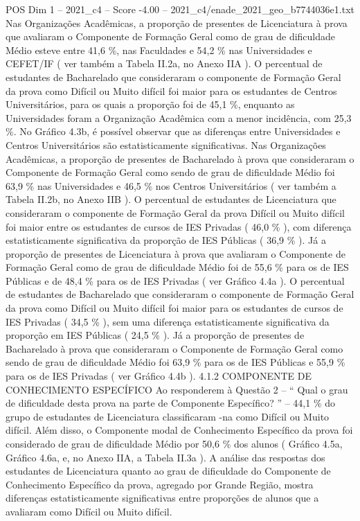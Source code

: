 \begin{textsample}{POS Dim 1 – 2021\_c4 – Score -4.00 – 2021\_c4/enade\_2021\_geo\_b7744036e1.txt}
Nas Organizações Acadêmicas, a proporção de presentes de Licenciatura à prova que avaliaram o Componente de Formação Geral como de grau de dificuldade Médio esteve entre 41,6 \%, nas Faculdades e 54,2 \% nas Universidades e CEFET/IF ( ver também a Tabela II.2a, no Anexo IIA ).
O percentual de estudantes de Bacharelado que consideraram o componente de Formação Geral da prova como Difícil ou Muito difícil foi maior para os estudantes de Centros Universitários, para os quais a proporção foi de 45,1 \%, enquanto as Universidades foram a Organização Acadêmica com a menor incidência, com 25,3 \%.
No Gráfico 4.3b, é possível observar que as diferenças entre Universidades e Centros Universitários são estatisticamente significativas.
Nas Organizações Acadêmicas, a proporção de presentes de Bacharelado à prova que consideraram o Componente de Formação Geral como sendo de grau de dificuldade Médio foi 63,9 \% nas Universidades e 46,5 \% nos Centros Universitários ( ver também a Tabela II.2b, no Anexo IIB ).
O percentual de estudantes de Licenciatura que consideraram o componente de Formação Geral da prova Difícil ou Muito difícil foi maior entre os estudantes de cursos de IES Privadas ( 46,0 \% ), com diferença estatisticamente significativa da proporção de IES Públicas ( 36,9 \% ).
Já a proporção de presentes de Licenciatura à prova que avaliaram o Componente de Formação Geral como de grau de dificuldade Médio foi de 55,6 \% para os de IES Públicas e de 48,4 \% para os de IES Privadas ( ver Gráfico 4.4a ).
O percentual de estudantes de Bacharelado que consideraram o componente de Formação Geral da prova como Difícil ou Muito difícil foi maior para os estudantes de cursos de IES Privadas ( 34,5 \% ), sem uma diferença estatisticamente significativa da proporção em IES Públicas ( 24,5 \% ).
Já a proporção de presentes de Bacharelado à prova que consideraram o Componente de Formação Geral como sendo de grau de dificuldade Médio foi 63,9 \% para os de IES Públicas e 55,9 \% para os de IES Privadas ( ver Gráfico 4.4b ). 4.1.2 COMPONENTE DE CONHECIMENTO ESPECÍFICO Ao responderem à Questão 2 – “ Qual o grau de dificuldade desta prova na parte de Componente Específico? ” – 44,1 \% do grupo de estudantes de Licenciatura classificaram -na como Difícil ou Muito difícil.
Além disso, o Componente modal de Conhecimento Específico da prova foi considerado de grau de dificuldade Médio por 50,6 \% dos alunos ( Gráfico 4.5a, Gráfico 4.6a, e, no Anexo IIA, a Tabela II.3a ).
A análise das respostas dos estudantes de Licenciatura quanto ao grau de dificuldade do Componente de Conhecimento Específico da prova, agregado por Grande Região, mostra diferenças estatisticamente significativas entre proporções de alunos que a avaliaram como Difícil ou Muito difícil.

\end{textsample}
